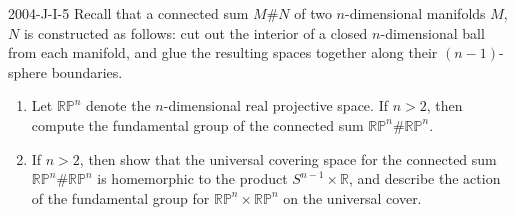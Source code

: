 \documentclass{article}
\begin{document}
	\begin{prb}{2004-J-I-5}
		Recall that a connected sum $M \# N$ of two $n$-dimensional manifolds $M$, $N$ is constructed as follows: cut out the interior of a closed $n$-dimensional ball from each manifold, and glue the resulting spaces together along their $(n - 1)$-sphere boundaries. \vspace{-0.25cm} 
		\begin{enumerate}[itemsep =-2pt,label = (\alph{*})]
			\item Let $\mathbb{RP}^{n}$ denote the $n$-dimensional real projective space. If $n > 2$, then compute the fundamental group of the connected sum $\mathbb{RP}^{n} \#\mathbb{RP}^{n}$. 
			\item If $n > 2$, then show that the universal covering space for the connected sum $\mathbb{RP}^{n}\# \mathbb{RP}^{n}$ is homemorphic to the product $S^{n-1} \times \mathbb{R}$, and describe the action of the fundamental group for $\mathbb{RP}^{n} \times \mathbb{RP}^{n}$ on the universal cover. 
		\end{enumerate}
	\end{prb}
\end{document}
